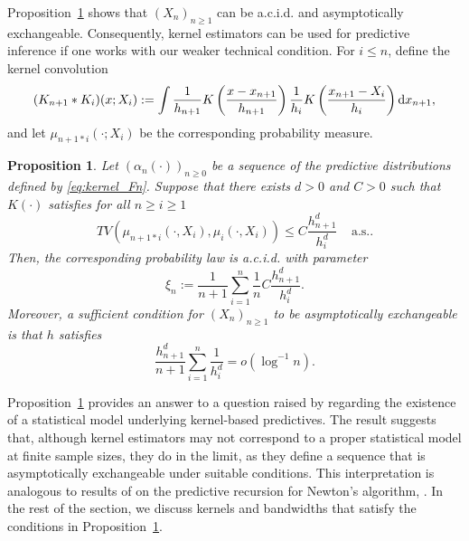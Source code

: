 \documentclass{article}
\newtheorem{proposition}{Proposition}
\theoremstyle{definition}
\newcommand{\di}{{\rm d}}
\renewcommand{\&}{and}
\begin{document}

Proposition~\ref{prop:kernel.acid} shows that $(X_n)_{n\geq1}$ can be a.c.i.d. and asymptotically exchangeable. Consequently, kernel estimators can be used for predictive inference if one works with our weaker technical condition. For $i\leq n$, define the kernel convolution
\begin{equation} \label{eq:kernel.convolution}
	(K_{n+1} * K_{i})(x;X_i):=\int  \frac{1}{h_{n+1}} K\left(\frac{x-x_{n+1}}{h_{n+1}}\right) \frac{1}{h_i}  K\left(\frac{x_{n+1}-X_i}{h_{i}}\right) \di x_{n+1},
\end{equation}
and let $\mu_{n+1*i}(\cdot;X_i)$ be the corresponding probability measure. 
\begin{proposition} \label{prop:kernel.acid}
	Let $(\alpha_{n}(\cdot))_{n \geq 0}$ be a sequence of the predictive distributions defined by \eqref{eq:kernel_Fn}. Suppose that there exists $d>0$ and $C>0$ such that $K(\cdot)$ satisfies for all $n\geq i\geq 1$
	\begin{equation}\label{eq:kernel_tv}
		TV(\mu_{n+1*i} (\cdot, X_i), \mu_{i} (\cdot,X_i)) \leq C \frac{h^d_{n+1}}{h^d_{i}}\ \ \ \ \ \text{a.s.}.
	\end{equation}
	Then, the corresponding probability law is a.c.i.d. with parameter
	\begin{equation} \label{eq:ker.norm.eta}
		\xi_{n}:=  \frac{1}{n+1} \sum_{i=1}^{n}\frac{1}{n} C \frac{h^d_{n+1}}{h^d_{i}}. 
	\end{equation}
	Moreover, a sufficient condition for $(X_n)_{n \geq 1}$ to be asymptotically exchangeable is that
 $h$ satisfies
	\begin{equation}\label{eq:kernel_bandwidth_cond}
		\frac{ h^d_{n+1}}{n+1} \sum_{i=1}^{n} 
		\frac{1}{h^d_{i}}=o \left(\log^{-1} n\right).
	\end{equation}
\end{proposition}


Proposition~\ref{prop:kernel.acid} provides an answer to a question raised by \cite{west1991kernel} regarding the existence of a statistical model underlying kernel-based predictives. The result suggests that, although kernel estimators may not correspond to a proper statistical model at finite sample sizes, they do in the limit, as they define a sequence that is asymptotically exchangeable under suitable conditions. %
This interpretation is analogous to results of \cite{fortini2020quasi} on the predictive recursion for Newton's algorithm, \citep{new98}. In the rest of the section, we discuss kernels and bandwidths that satisfy the conditions in Proposition~\ref{prop:kernel.acid}. 
\vspace{0.3cm}
\end{document}

